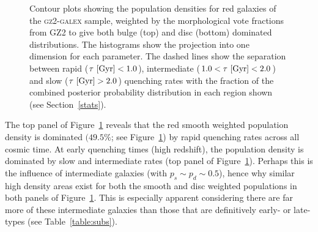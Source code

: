 \begin{figure}
\caption[Population densities of red smooth and disc galaxies]{Contour plots showing the population densities for red galaxies of the \textsc{gz2-galex} sample, weighted by the morphological vote fractions from GZ2 to give both bulge (top) and disc (bottom) dominated distributions. The histograms show the projection into one dimension for each parameter. The dashed lines show the separation between rapid ($\tau ~\rm{[Gyr]} < 1.0$), intermediate ($1.0 < \tau ~\rm{[Gyr]} < 2.0$) and slow ($\tau ~\rm{[Gyr]} > 2.0$) quenching rates with the fraction of the combined posterior probability distribution in each region shown (see Section~\ref{stats}).}
\label{red_s}
\end{figure}

The top panel of Figure~\ref{red_s} reveals that the red smooth weighted population density is dominated $(49.5\%$; see Figure~\ref{red_s}) by rapid quenching rates across all cosmic time. At early quenching times (high redshift), the population density is dominated by slow and intermediate rates (top panel of Figure~\ref{red_s}). Perhaps this is the influence of intermediate galaxies (with $p_s \sim p_d \sim 0.5$), hence why similar high density areas exist for both the smooth and disc weighted populations in both panels of Figure~\ref{red_s}. This is especially apparent considering there are far more of these intermediate galaxies than those that are definitively early- or late-types (see Table~\ref{table:subs}). 

